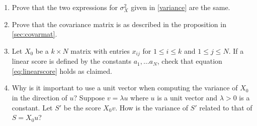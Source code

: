 \documentclass[]{article}
\begin{document}
\begin{enumerate}
\def\labelenumi{\arabic{enumi}.}
\item
  Prove that the two expressions for \(\sigma_{X}^2\) given in
  \cref{variance} are the same.
\item
  Prove that the covariance matrix is as described in the proposition in
  \ref{sec:covarmat}.
\item
  Let \(X_{0}\) be a \(k\times N\) matrix with entries \(x_{ij}\) for
  \(1\le i\le k\) and \(1\le j\le N\). If a linear score is defined by
  the constants \(a_{1},\ldots a_{N}\), check that equation
  \cref{eq:linearscore} holds as claimed.
\item
  Why is it important to use a unit vector when computing the variance
  of \(X_{0}\) in the direction of \(u\)? Suppose \(v=\lambda u\) where
  \(u\) is a unit vector and \(\lambda>0\) is a constant. Let \(S'\) be
  the score \(X_{0}v\). How is the variance of \(S'\) related to that of
  \(S=X_{0}u\)?
\end{enumerate}
\end{document}
